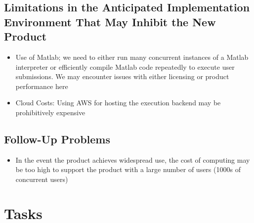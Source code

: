 \documentclass[12pt]{article}
\begin{document}
\subsection{Limitations in the Anticipated Implementation Environment That May
Inhibit the New Product}
\begin{itemize}
    \item Use of Matlab; we need to either run many concurrent instances of a Matlab interpreter or efficiently compile Matlab code repeatedly to execute user submissions. We may encounter issues with either licensing or product performance here
    \item Cloud Costs: Using AWS for hosting the execution backend may be prohibitively expensive
\end{itemize}

\subsection{Follow-Up Problems}
\begin{itemize}
    \item In the event the product achieves widespread use, the cost of computing may be too high to support the product with a large number of users (1000s of concurrent users)
\end{itemize}

\section{Tasks}
\end{document}
